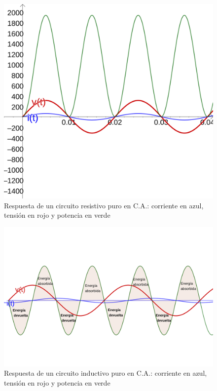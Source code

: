 \begin{figure}[htbp]
  \includegraphics[scale=0.1]{images/potencia_alterna_resistiva}
  \caption{Respuesta de un circuito resistivo puro en C.A.: corriente en azul, tensión en rojo y potencia en verde}
  \label{fig:potencia_alterna_resistiva}
\end{figure}

\begin{figure}[htbp]
  \includegraphics[scale=0.1]{images/potencia_alterna_inductiva}
  \caption{Respuesta de un circuito inductivo puro en C.A.: corriente en azul, tensión en rojo y potencia en verde}
  \label{fig:potencia_alterna_inductiva}
\end{figure}

